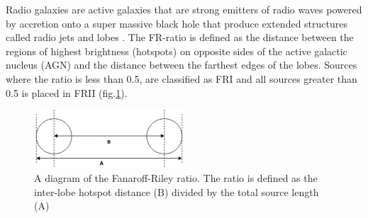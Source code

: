 \documentclass[conference]{IEEEtran}
\begin{document}
Radio galaxies are active galaxies that are strong emitters of
radio waves powered by accretion onto a super massive black hole that produce extended structures called radio jets and lobes \cite{wierzbowska_2011}. The FR-ratio is defined as the distance between the regions of highest brightness (hotspots) on opposite sides of the active galactic nucleus (AGN) and the distance between the farthest edges of the lobes. Sources where the ratio is less than 0.5, are classified as FRI and all sources greater than 0.5 is placed in FRII (fig.\ref{fig:becker2019}). 
\begin{figure}[h]
    \centering
    \includegraphics[width=0.5\textwidth]{EPS/ratio_becker.eps}
    \caption{A diagram of the Fanaroff-Riley ratio. The ratio is defined as the inter-lobe hotspot distance (B) divided by the total source length (A)}
    \label{fig:becker2019}
\end{figure}



\end{document}
